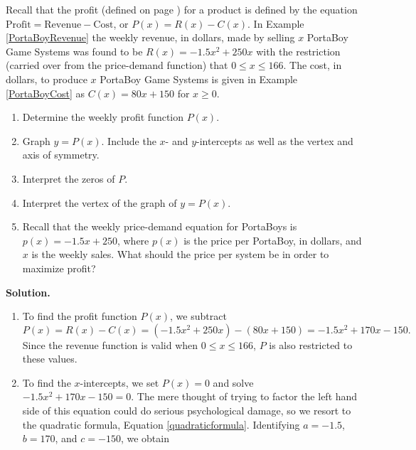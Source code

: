 \smallskip
 
\begin{ex}  \label{PortaBoyProfit} Recall that the profit (defined on page \pageref{pricerevenuecostprofit}) for a product  is defined by the equation $\mbox{Profit} = \mbox{Revenue} - \mbox{Cost}$, or $P(x) = R(x) - C(x)$.  In Example \ref{PortaBoyRevenue} the weekly revenue, in dollars, made by selling $x$ PortaBoy Game Systems was found to be $R(x) = -1.5x^2+250x$ with the restriction (carried over from the price-demand function) that $0 \leq x \leq 166$.  The cost, in dollars, to produce $x$ PortaBoy Game Systems is given in Example \ref{PortaBoyCost} as $C(x) = 80x + 150$ for $x \geq 0$. 

\begin{enumerate}

\item  Determine the weekly profit function $P(x)$.

\item  Graph $y = P(x)$.  Include the $x$- and $y$-intercepts as well as the vertex and axis of symmetry.

\item  Interpret the zeros of $P$.

\item  Interpret the vertex of the graph of $y = P(x)$.

\item  Recall that the weekly price-demand equation for PortaBoys is  $p(x) = -1.5x+250$, where $p(x)$ is the price per PortaBoy, in dollars, and $x$ is the weekly sales.  What should the price per system be in order to maximize profit?

\end{enumerate}

{\bf Solution.}  

\begin{enumerate}

\item  To find the profit function $P(x)$, we subtract \[P(x) = R(x) - C(x) = \left(-1.5x^2+250x\right) - \left(80x + 150\right) = -1.5x^2+170x-150.\]  Since the revenue function is valid when $0 \leq x \leq 166$, $P$ is also restricted to these values. 

\item  To find the $x$-intercepts, we set $P(x) = 0$ and solve  $-1.5x^2+170x-150=0$. The mere thought of trying to factor the left hand side of this equation could do serious psychological damage, so we resort to the quadratic formula, Equation \ref{quadraticformula}.  Identifying $a = -1.5$, $b=170$, and $c=-150$, we obtain


\end{enumerate}
\end{ex}

